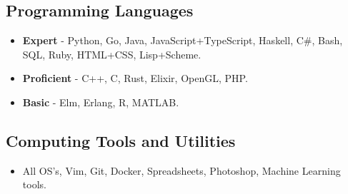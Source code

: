 \documentclass{jcgcv}
\begin{document}
\begin{column}
\subsection{Programming Languages}
\begin{itemize}
  \item \textbf{Expert} - Python, Go, Java, JavaScript+TypeScript, Haskell, C\#, Bash, SQL, Ruby, HTML+CSS, Lisp+Scheme.
  \item \textbf{Proficient} - C++, C, Rust, Elixir, OpenGL, PHP.
  \item \textbf{Basic} - Elm, Erlang, R, MATLAB.
\end{itemize}

\subsection{Computing Tools and Utilities}
\begin{itemize}
  \item All OS's, Vim, Git, Docker, Spreadsheets, Photoshop, Machine Learning tools.
\end{itemize}



\end{column}%
\end{document}
